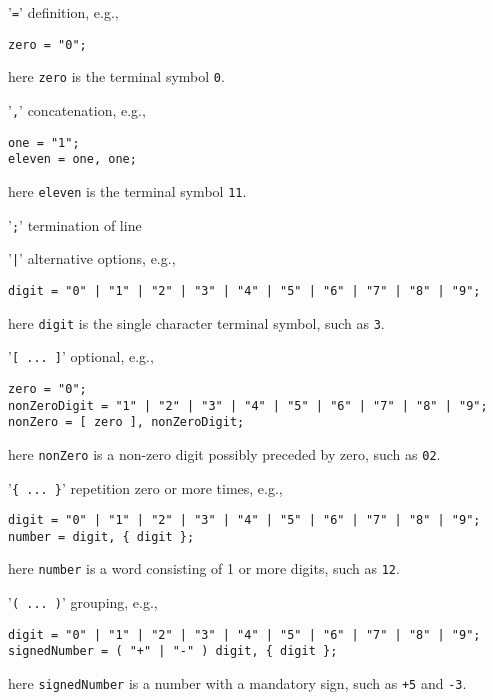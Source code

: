 \documentclass[fsharpnotes.tex]{subfiles}
\begin{document}
\begin{description}
\item '\lstinline[language=ebnf]|=|' definition, e.g., 
  \begin{lstlisting}[language=ebnf]
zero = "0";
  \end{lstlisting}
  here \lstinline[language=ebnf]|zero| is the terminal symbol \lstinline[language=ebnf]|0|.
\item '\lstinline[language=ebnf]|,|' concatenation, e.g.,
  \begin{lstlisting}[language=ebnf]
one = "1";
eleven = one, one;
  \end{lstlisting}
  here \lstinline[language=ebnf]|eleven| is the terminal symbol \lstinline[language=ebnf]|11|.
\item '\lstinline[language=ebnf]|;|' termination of line
\item '\lstinline[language=ebnf]!|!' alternative options, e.g.,
  \begin{lstlisting}[language=ebnf]
digit = "0" | "1" | "2" | "3" | "4" | "5" | "6" | "7" | "8" | "9";
  \end{lstlisting}
  here \lstinline[language=ebnf]|digit| is the single character terminal symbol, such as \lstinline[language=ebnf]|3|.
\item '\lstinline[language=ebnf]|[ ... ]|' optional, e.g.,
  \begin{lstlisting}[language=ebnf]
zero = "0";
nonZeroDigit = "1" | "2" | "3" | "4" | "5" | "6" | "7" | "8" | "9";
nonZero = [ zero ], nonZeroDigit;
  \end{lstlisting}
  here \lstinline[language=ebnf]|nonZero| is a non-zero digit possibly preceded by zero, such as \lstinline[language=ebnf]|02|.
\item '\lstinline[language=ebnf]|{ ... }|' repetition zero or more times, e.g., 
  \begin{lstlisting}[language=ebnf]
digit = "0" | "1" | "2" | "3" | "4" | "5" | "6" | "7" | "8" | "9";
number = digit, { digit };
  \end{lstlisting}
  here \lstinline[language=ebnf]|number| is a word consisting of 1 or more digits, such as \lstinline[language=ebnf]|12|.
\item '\lstinline[language=ebnf]|( ... )|' grouping, e.g.,
  \begin{lstlisting}[language=ebnf]
digit = "0" | "1" | "2" | "3" | "4" | "5" | "6" | "7" | "8" | "9";
signedNumber = ( "+" | "-" ) digit, { digit };
  \end{lstlisting}
  here \lstinline[language=ebnf]|signedNumber| is a number with a mandatory sign, such as \lstinline[language=ebnf]|+5| and \lstinline[language=ebnf]|-3|.

\end{description}
\end{document}
